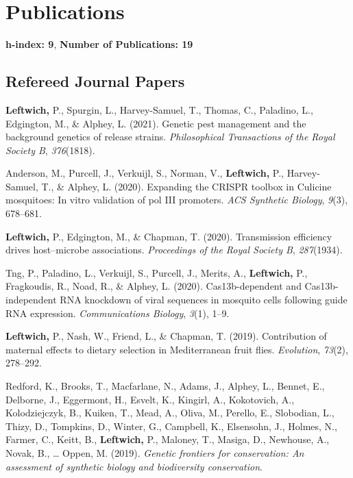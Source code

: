 \documentclass[11pt, a4paper]{awesome-cv}
\begin{document}
\newpage

\hypertarget{publications}{%
\section{Publications}\label{publications}}

\textbf{h-index: 9}, \textbf{Number of Publications: 19}

\hypertarget{refereed-journal-papers}{%
\subsection{Refereed Journal Papers}\label{refereed-journal-papers}}

\hypertarget{refs_journals}{}
\leavevmode\hypertarget{ref-13}{}%
\textbf{Leftwich,} P., Spurgin, L., Harvey-Samuel, T., Thomas, C.,
Paladino, L., Edgington, M., \& Alphey, L. (2021). Genetic pest
management and the background genetics of release strains.
\emph{Philosophical Transactions of the Royal Society B},
\emph{376}(1818).

\leavevmode\hypertarget{ref-11}{}%
Anderson, M., Purcell, J., Verkuijl, S., Norman, V., \textbf{Leftwich,}
P., Harvey-Samuel, T., \& Alphey, L. (2020). Expanding the CRISPR
toolbox in {Culicine} mosquitoes: In vitro validation of pol III
promoters. \emph{ACS Synthetic Biology}, \emph{9}(3), 678--681.

\leavevmode\hypertarget{ref-14}{}%
\textbf{Leftwich,} P., Edgington, M., \& Chapman, T. (2020).
Transmission efficiency drives host--microbe associations.
\emph{Proceedings of the Royal Society B}, \emph{287}(1934).

\leavevmode\hypertarget{ref-16}{}%
Tng, P., Paladino, L., Verkuijl, S., Purcell, J., Merits, A.,
\textbf{Leftwich,} P., Fragkoudis, R., Noad, R., \& Alphey, L. (2020).
Cas13b-dependent and {Cas}13b-independent {RNA} knockdown of viral
sequences in mosquito cells following guide {RNA} expression.
\emph{Communications Biology}, \emph{3}(1), 1--9.

\leavevmode\hypertarget{ref-15}{}%
\textbf{Leftwich,} P., Nash, W., Friend, L., \& Chapman, T. (2019).
Contribution of maternal effects to dietary selection in {Mediterranean}
fruit flies. \emph{Evolution}, \emph{73}(2), 278--292.

\leavevmode\hypertarget{ref-6}{}%
Redford, K., Brooks, T., Macfarlane, N., Adams, J., Alphey, L., Bennet,
E., Delborne, J., Eggermont, H., Esvelt, K., Kingirl, A., Kokotovich,
A., Kolodziejczyk, B., Kuiken, T., Mead, A., Oliva, M., Perello, E.,
Slobodian, L., Thizy, D., Tompkins, D., Winter, G., Campbell, K.,
Elsensohn, J., Holmes, N., Farmer, C., Keitt, B., \textbf{Leftwich,} P.,
Maloney, T., Masiga, D., Newhouse, A., Novak, B., \ldots{} Oppen, M.
(2019). \emph{Genetic frontiers for conservation: An assessment of
synthetic biology and biodiversity conservation}.
\end{document}
